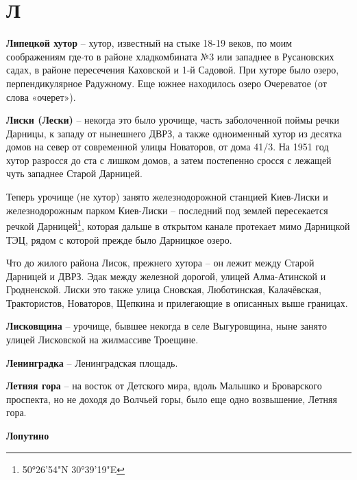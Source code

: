 \chapter*{Л}

\textbf{Липецкой хутор} – хутор, известный на стыке 18-19 веков, по моим соображениям где-то в районе хладкомбината №3 или западнее в Русановских садах, в районе пересечения Каховской и 1-й Садовой. При хуторе было озеро, перпендикулярное Радужному. Еще южнее находилось озеро Очереватое (от слова «очерет»).\\

\medskip

\textbf{Лиски (Лески)} – некогда это было урочище, часть заболоченной поймы речки Дарницы, к западу от нынешнего ДВРЗ, а также одноименный хутор из десятка домов на север от современной улицы Новаторов, от дома 41/3. На 1951 год хутор разросся до ста с лишком домов, а затем постепенно сросся с лежащей чуть западнее Старой Дарницей.

Теперь урочище (не хутор) занято железнодорожной станцией Киев-Лиски и железнодорожным парком Киев-Лиски – последний под землей пересекается речкой Дарницей\footnote{50°26'54"N 30°39'19"E}, которая дальше в открытом канале протекает мимо Дарницкой ТЭЦ, рядом с которой прежде было Дарницкое озеро.

Что до жилого района Лисок, прежнего хутора – он лежит между Старой Дарницей и ДВРЗ. Эдак между железной дорогой, улицей Алма-Атинской и Гродненской. Лиски это также улица Сновская, Люботинская, Калачёвская, Трактористов, Новаторов, Щепкина и прилегающие в описанных выше границах.\\

\medskip

\textbf{Лисковщина} – урочище, бывшее некогда в селе Выгуровщина, ныне занято улицей Лисковской на жилмассиве Троещине.\\

\medskip

\textbf{Ленинградка} – Ленинградская площадь.\\

\medskip

\textbf{Летняя гора} – на восток от Детского мира, вдоль Малышко и Броварского проспекта, но не доходя до Волчьей горы, было еще одно возвышение, Летняя гора.\\

\medskip

\textbf{Лопутино}

